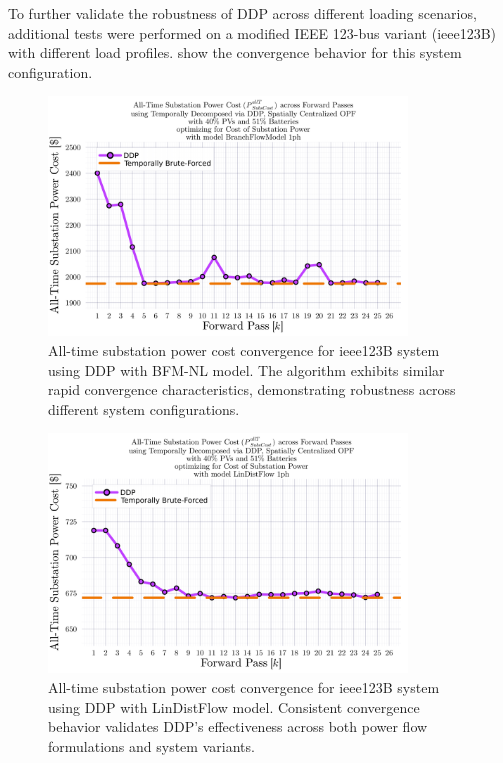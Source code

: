 To further validate the robustness of DDP across different loading scenarios, additional tests were performed on a modified IEEE 123-bus variant (ieee123B) with different load profiles.  show the convergence behavior for this system configuration.

\begin{figure}[h]
    \centering
    \includegraphics[width=0.85\textwidth]{figures/SubstationPowerCostAllTime_vs_k_26_for_subsPowerCost_min_with_scd_alpha_2_124_gamma_0_0_via_tmprl_dcmpsd_spat_centr_system_with_bfm_NL_1ph.png}
    \caption{All-time substation power cost convergence for ieee123B system using DDP with BFM-NL model. The algorithm exhibits similar rapid convergence characteristics, demonstrating robustness across different system configurations.}
    \label{fig:ddp-convergence-bfm-b}
\end{figure}

\begin{figure}[h]
    \centering
    \includegraphics[width=0.85\textwidth]{figures/SubstationPowerCostAllTime_vs_k_26_for_subsPowerCost_min_with_scd_alpha_0_7162_gamma_0_0_via_tmprl_dcmpsd_spat_centr_system_with_ldf_1ph.png}
    \caption{All-time substation power cost convergence for ieee123B system using DDP with LinDistFlow model. Consistent convergence behavior validates DDP's effectiveness across both power flow formulations and system variants.}
    \label{fig:ddp-convergence-ldf-b}
\end{figure}

